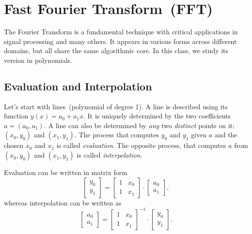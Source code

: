\setcounter{definition}{0} \setcounter{property}{0} \setcounter{claim}{0} \setcounter{fact}{0} \setcounter{corollary}{0} \setcounter{figure}{0}

\section{Fast Fourier Transform~(FFT)}

The Fourier Transform is a fundamental technique with critical applications in
signal processing and many others. It appears
in various forms across different domains, but all share the same
algorithmic core. In this class, we study its version in polynomials.

\subsection*{Evaluation and Interpolation}

Let's start with lines~(polynomial of degree 1).
A line is described using its function $y(x) = a_0 + a_1 x$.
It is uniquely determined by the two coefficients $a = (a_0, a_1)$.
A line can also be determined by \emph{any} two \emph{distinct} points on it: $(x_0, y_0)$ and $(x_1, y_1)$.
The process that computes $y_0$ and $y_1$ given $a$ and the chosen $x_0$ and $x_1$
is called \emph{evaluation}. The opposite process, that computes $a$ from $(x_0, y_0)$ and $(x_1, y_1)$
is called \emph{interpolation}.

Evaluation can be written in matrix form 
\[
\begin{bmatrix} y_0 \\ y_1 \end{bmatrix}
=
\begin{bmatrix} 1 & x_0 \\ 1 & x_1 \end{bmatrix}
\cdot
\begin{bmatrix} a_0 \\ a_1 \end{bmatrix},
\]
whereas interpolation can be written as 
\[
\begin{bmatrix} a_0 \\ a_1 \end{bmatrix}
=
\begin{bmatrix} 1 & x_0 \\ 1 & x_1 \end{bmatrix}^{-1}
\cdot
\begin{bmatrix} y_0 \\ y_1 \end{bmatrix}.
\]

